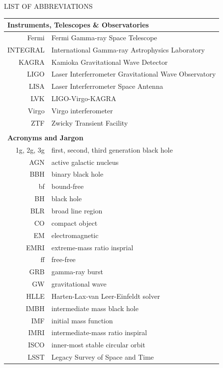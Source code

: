 
\begin{center}
LIST OF ABBREVIATIONS

{}

\begin{tabular}{rl}
\toprule
\multicolumn{2}{l}{\textbf{Instruments, Telescopes \& Observatories}} \\
\midrule
Fermi & Fermi Gamma-ray Space Telescope \\
INTEGRAL & International Gamma-ray Astrophysics Laboratory \\
KAGRA & Kamioka Gravitational Wave Detector \\
LIGO & Laser Interferrometer Gravitational Wave Observatory \\
LISA & Laser Interferrometer Space Antenna \\
LVK & LIGO-Virgo-KAGRA \\
Virgo & Virgo interferometer \\
ZTF & Zwicky Transient Facility \\
\\
\toprule
\multicolumn{2}{l}{\textbf{Acronyms and Jargon}} \\
\midrule
1g, 2g, 3g & first, second, third generation black hole \\
AGN & active galactic nucleus \\
BBH & binary black hole \\
bf & bound-free \\
BH & black hole \\
BLR & broad line region \\
CO & compact object \\
EM & electromagnetic \\
EMRI & extreme-mass ratio insprial \\
ff & free-free \\
GRB & gamma-ray burst \\
GW & gravitational wave \\
HLLE & Harten-Lax-van Leer-Einfeldt solver \\
IMBH & intermediate mass black hole \\
IMF & initial mass function \\
IMRI & intermediate-mass ratio inspiral \\
ISCO & inner-most stable circular orbit \\
LSST & Legacy Survey of Space and Time \\

\end{tabular}
\end{center}

